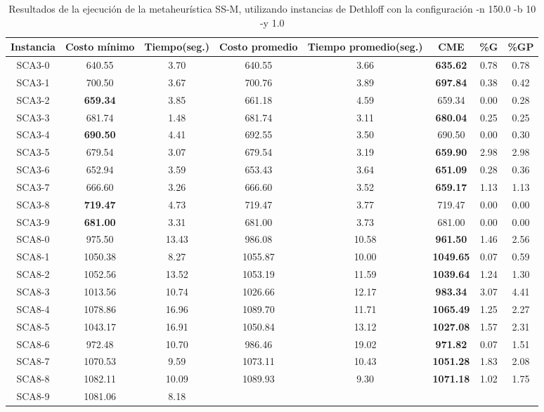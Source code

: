\begin{table}[h]
\caption{Resultados de la ejecución de la metaheurística SS-M, utilizando instancias de Dethloff con la configuración -n 150.0 -b 10 -y 1.0}
\centering
\small
\begin{tabular}{c c c c c c c c}
\hline\hline
Instancia & Costo mínimo & Tiempo(seg.) & Costo promedio & Tiempo promedio(seg.) & CME & \%G & \%GP \\ [0.5ex]
\hline
SCA3-0 & 640.55 & 3.70 & 
640.55 & 3.66 & \bf{635.62} & 
0.78 & 0.78\\SCA3-1 & 700.50 & 3.67 & 
700.76 & 3.89 & \bf{697.84} & 
0.38 & 0.42\\SCA3-2 & \bf{659.34} & 3.85 & 
661.18 & 4.59 & 659.34 & 0.00
 & 0.28\\SCA3-3 & 681.74 & 1.48 & 
681.74 & 3.11 & \bf{680.04} & 
0.25 & 0.25\\SCA3-4 & \bf{690.50} & 4.41 & 
692.55 & 3.50 & 690.50 & 0.00
 & 0.30\\SCA3-5 & 679.54 & 3.07 & 
679.54 & 3.19 & \bf{659.90} & 
2.98 & 2.98\\SCA3-6 & 652.94 & 3.59 & 
653.43 & 3.64 & \bf{651.09} & 
0.28 & 0.36\\SCA3-7 & 666.60 & 3.26 & 
666.60 & 3.52 & \bf{659.17} & 
1.13 & 1.13\\SCA3-8 & \bf{719.47} & 4.73 & 
719.47 & 3.77 & 719.47 & 0.00
 & 0.00\\
SCA3-9 & \bf{681.00} & 3.31 & 
681.00 & 3.73 & 681.00 & 0.00
 & 0.00\\
SCA8-0 & 975.50 & 13.43 & 
986.08 & 10.58 & \bf{961.50} & 
1.46 & 2.56\\SCA8-1 & 1050.38 & 8.27 & 
1055.87 & 10.00 & \bf{1049.65} & 
0.07 & 0.59\\SCA8-2 & 1052.56 & 13.52 & 
1053.19 & 11.59 & \bf{1039.64} & 
1.24 & 1.30\\SCA8-3 & 1013.56 & 10.74 & 
1026.66 & 12.17 & \bf{983.34} & 
3.07 & 4.41\\SCA8-4 & 1078.86 & 16.96 & 
1089.70 & 11.71 & \bf{1065.49} & 
1.25 & 2.27\\SCA8-5 & 1043.17 & 16.91 & 
1050.84 & 13.12 & \bf{1027.08} & 
1.57 & 2.31\\SCA8-6 & 972.48 & 10.70 & 
986.46 & 19.02 & \bf{971.82} & 
0.07 & 1.51\\SCA8-7 & 1070.53 & 9.59 & 
1073.11 & 10.43 & \bf{1051.28} & 
1.83 & 2.08\\SCA8-8 & 1082.11 & 10.09 & 
1089.93 & 9.30 & \bf{1071.18} & 
1.02 & 1.75\\SCA8-9 & 1081.06 & 8.18 & 

\end{tabular}
\end{table}
